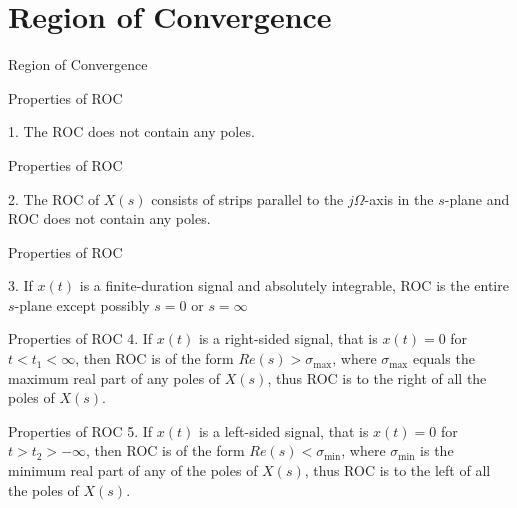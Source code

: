 \documentclass[aspectratio=169,xcolor=dvipsnames,svgnames,x11names,fleqn]{beamer}
\begin{document}
\section{Region of Convergence}


\begin{frame}{}
    \begin{center}
    \Huge \bf \color{DarkBlue}
   \faAreaChart
    
   Region of Convergence


\end{center}
\end{frame}

\begin{frame}{Properties of ROC}

    1. The ROC does not contain any poles. 
    
\end{frame}


\begin{frame}{Properties of ROC}

    2. The ROC of $X(s)$ consists of strips parallel to the $j\Omega$-axis in the $s$-plane and ROC does not contain any poles.
    
\end{frame}

\begin{frame}{Properties of ROC}

    3.  If $x(t)$ is a finite-duration signal and absolutely integrable, ROC is the entire $s$-plane except possibly $s = 0$ or $s = \infty $
    
\end{frame}

\begin{frame}{Properties of ROC}
    4. If $x(t)$ is a right-sided signal, that is $x(t) = 0$ for $t < t_1 < \infty$, then ROC is of the form $Re(s) > \sigma_{\textrm{max}}$, where $\sigma_{\textrm{max}}$ equals the maximum real part of any poles of $X(s)$, thus ROC is to the right of all the poles of $X(s)$.
\end{frame}

\begin{frame}{Properties of ROC}
    5. If $x(t)$ is a left-sided signal, that is $x(t) = 0$ for $t > t_2 > -\infty$, then ROC is of the form $Re(s) < \sigma_{\textrm{min}}$, where $\sigma_{\textrm{min}}$ is the minimum real part of any of the poles of $X(s)$, thus ROC is to the left of all the poles of $X(s)$. 
\end{frame}
\end{document}
